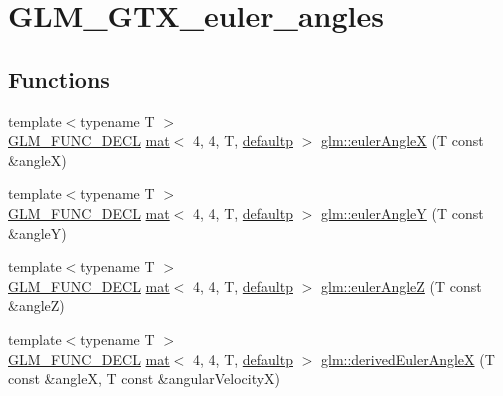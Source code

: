 \hypertarget{group__gtx__euler__angles}{}\section{G\+L\+M\+\_\+\+G\+T\+X\+\_\+euler\+\_\+angles}
\label{group__gtx__euler__angles}
\subsection*{Functions}
\begin{DoxyCompactItemize}
\item 
{\footnotesize template$<$typename T $>$ }\\\hyperlink{setup_8hpp_ab2d052de21a70539923e9bcbf6e83a51}{G\+L\+M\+\_\+\+F\+U\+N\+C\+\_\+\+D\+E\+CL} \hyperlink{structglm_1_1mat}{mat}$<$ 4, 4, T, \hyperlink{namespaceglm_a36ed105b07c7746804d7fdc7cc90ff25a9d21ccd8b5a009ec7eb7677befc3bf51}{defaultp} $>$ \hyperlink{group__gtx__euler__angles_gafba6282e4ed3ff8b5c75331abfba3489}{glm\+::euler\+AngleX} (T const \&angleX)
\item 
{\footnotesize template$<$typename T $>$ }\\\hyperlink{setup_8hpp_ab2d052de21a70539923e9bcbf6e83a51}{G\+L\+M\+\_\+\+F\+U\+N\+C\+\_\+\+D\+E\+CL} \hyperlink{structglm_1_1mat}{mat}$<$ 4, 4, T, \hyperlink{namespaceglm_a36ed105b07c7746804d7fdc7cc90ff25a9d21ccd8b5a009ec7eb7677befc3bf51}{defaultp} $>$ \hyperlink{group__gtx__euler__angles_gab84bf4746805fd69b8ecbb230e3974c5}{glm\+::euler\+AngleY} (T const \&angleY)
\item 
{\footnotesize template$<$typename T $>$ }\\\hyperlink{setup_8hpp_ab2d052de21a70539923e9bcbf6e83a51}{G\+L\+M\+\_\+\+F\+U\+N\+C\+\_\+\+D\+E\+CL} \hyperlink{structglm_1_1mat}{mat}$<$ 4, 4, T, \hyperlink{namespaceglm_a36ed105b07c7746804d7fdc7cc90ff25a9d21ccd8b5a009ec7eb7677befc3bf51}{defaultp} $>$ \hyperlink{group__gtx__euler__angles_ga5b3935248bb6c3ec6b0d9297d406e251}{glm\+::euler\+AngleZ} (T const \&angleZ)
\item 
{\footnotesize template$<$typename T $>$ }\\\hyperlink{setup_8hpp_ab2d052de21a70539923e9bcbf6e83a51}{G\+L\+M\+\_\+\+F\+U\+N\+C\+\_\+\+D\+E\+CL} \hyperlink{structglm_1_1mat}{mat}$<$ 4, 4, T, \hyperlink{namespaceglm_a36ed105b07c7746804d7fdc7cc90ff25a9d21ccd8b5a009ec7eb7677befc3bf51}{defaultp} $>$ \hyperlink{group__gtx__euler__angles_ga994b8186b3b80d91cf90bc403164692f}{glm\+::derived\+Euler\+AngleX} (T const \&angleX, T const \&angular\+VelocityX)

\end{DoxyCompactItemize}
